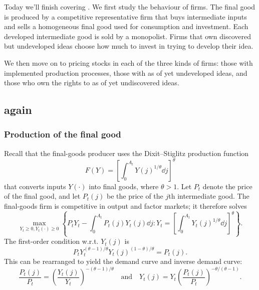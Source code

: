 \documentclass[11pt,letterpaper,reqno,oneside]{article}
\begin{document}
Today we'll finish covering \textcite{CominGertler2006}. We first study the behaviour of firms. The final good is produced by a competitive representative firm that buys intermediate inputs and sells a homogeneous final good used for consumption and investment. Each developed intermediate good is sold by a monopolist. Firms that own discovered but undeveloped ideas choose how much to invest in trying to develop their idea.

We then move on to pricing stocks in each of the three kinds of firms: those with implemented production processes, those with as of yet undeveloped ideas, and those who own the rights to as of yet undiscovered ideas.



\subsection{\texorpdfstring{\textcite{CominGertler2006}}{Comin and Gertler (2006)} again}
\label{sec:16Nov2015:coming_gertler_again}


\subsubsection{Production of the final good}
\label{sec:16Nov2015:coming_gertler_again:production_final_good}

Recall that the final-goods producer uses the Dixit--Stiglitz production function
%
\begin{equation*}
	F(Y) = \left[ \int_0^{A_t} Y(j)^{1/\theta} \dd j \right]^\theta 
\end{equation*}
%
that converts inputs $Y(\cdot)$ into final goods, where $\theta>1$. Let $P_t$ denote the price of the final good, and let $P_t(j)$ be the price of the $j$th intermediate good. The final-goods firm is competitive in output and factor markets; it therefore solves
%
\begin{equation*}
	\max_{Y_t\geq 0,Y_t(\cdot) \geq 0} \left\{
	P_t Y_t - \int_0^{A_t} P_t(j) Y_t(j) \dd j :
	Y_t = \left[ \int_0^{A_t} Y_t(j)^{1/\theta} \dd j \right]^\theta 
	\right\} .
\end{equation*}
%
The first-order condition w.r.t. $Y_t(j)$ is
%
\begin{equation*}
	P_t Y_t^{(\theta-1)/\theta} Y_t(j)^{(1-\theta)/\theta} = P_t(j) .
\end{equation*}
%
This can be rearranged to yield the demand curve and inverse demand curve:
%
\begin{equation*}
	\frac{ P_t(j) }{ P_t } 
	= \left( \frac{Y_t(j)}{Y_t} \right)^{-(\theta-1)/\theta} 
	\quad\text{and}\quad
	Y_t(j) 
	= Y_t \left( \frac{ P_t(j) }{ P_t } \right)^{-\theta/(\theta-1)} .
\end{equation*}
\end{document}
